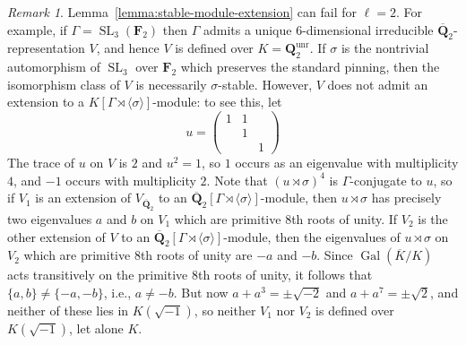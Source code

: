 \documentclass[reqno]{amsart}
\numberwithin{equation}{subsection}
\newcommand{\F}{\mathbf{F}}
\newcommand{\Q}{\mathbf{Q}}
\newcommand{\Gal}{\operatorname{Gal}}
\newcommand{\ol}[1]{\overline{#1}}
\DeclareMathOperator{\SL}{SL}
\DeclareMathOperator{\unr}{unr}
\theoremstyle{remark}
\newtheorem{remark}[thm]{Remark}
\numberwithin{equation}{subsection}
\numberwithin{figure}{subsection}
\begin{document}
\begin{remark}
    Lemma~\ref{lemma:stable-module-extension} can fail for $\ell = 2$. For example, if $\Gamma = \SL_3(\F_2)$ then $\Gamma$ admits a unique $6$-dimensional irreducible $\ol\Q_2$-representation $V$, and hence $V$ is defined over $K = \Q_2^{\unr}$. If $\sigma$ is the nontrivial automorphism of $\SL_3$ over $\F_2$ which preserves the standard pinning, then the isomorphism class of $V$ is necessarily $\sigma$-stable. However, $V$ does not admit an extension to a $K[\Gamma \rtimes \langle\sigma\rangle]$-module: to see this, let
    \[
    u = \begin{pmatrix}
        1&1& \\ &1& \\ &&1
    \end{pmatrix}
    \]
    The trace of $u$ on $V$ is $2$ and $u^2 = 1$, so $1$ occurs as an eigenvalue with multiplicity $4$, and $-1$ occurs with multiplicity $2$. Note that $(u \rtimes \sigma)^4$ is $\Gamma$-conjugate to $u$, so if $V_1$ is an extension of $V_{\ol\Q_2}$ to an $\ol\Q_2[\Gamma \rtimes \langle\sigma\rangle]$-module, then $u \rtimes \sigma$ has precisely two eigenvalues $a$ and $b$ on $V_1$ which are primitive $8$th roots of unity. If $V_2$ is the other extension of $V$ to an $\ol\Q_2[\Gamma \rtimes \langle\sigma\rangle]$-module, then the eigenvalues of $u \rtimes \sigma$ on $V_2$ which are primitive $8$th roots of unity are $-a$ and $-b$. Since $\Gal(\ol K/K)$ acts transitively on the primitive $8$th roots of unity, it follows that $\{a, b\} \neq \{-a, -b\}$, i.e., $a \neq -b$. But now $a + a^3 = \pm\sqrt{-2}$ and $a + a^7 = \pm\sqrt{2}$, and neither of these lies in $K(\sqrt{-1})$, so neither $V_1$ nor $V_2$ is defined over $K(\sqrt{-1})$, let alone $K$.
\end{remark}
\end{document}
